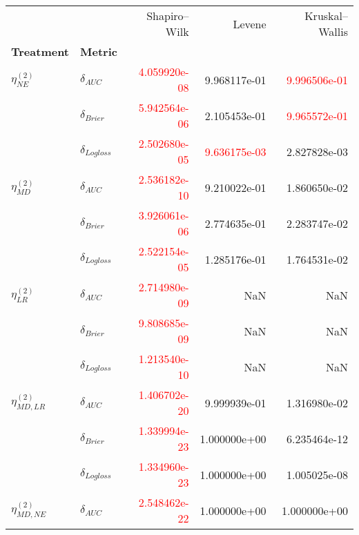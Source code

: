 \begin{table}[!h]
    \centering
    \begin{tabular}{l|lrrr}
        \toprule
                             &         &       Shapiro–Wilk &        Levene &        Kruskal–Wallis \\
        \textbf{Treatment} & \textbf{Metric} &               &               &                \\
        \midrule
        $\eta^{(2)}_{NE}$ & $\delta_{AUC}$ &  \textcolor{red}{4.059920e-08} &  9.968117e-01 &   \textcolor{red}{9.996506e-01} \\
                             & $\delta_{Brier}$ &  \textcolor{red}{5.942564e-06} &  2.105453e-01 &   \textcolor{red}{9.965572e-01} \\
                             & $\delta_{Logloss}$ &  \textcolor{red}{2.502680e-05} &  \textcolor{red}{9.636175e-03} &   2.827828e-03 \\
                             \hline
        $\eta^{(2)}_{MD}$ & $\delta_{AUC}$ &  \textcolor{red}{2.536182e-10} &  9.210022e-01 &   1.860650e-02 \\
                             & $\delta_{Brier}$ &  \textcolor{red}{3.926061e-06} &  2.774635e-01 &   2.283747e-02 \\
                             & $\delta_{Logloss}$ &  \textcolor{red}{2.522154e-05} &  1.285176e-01 &   1.764531e-02 \\
                             \hline
        $\eta^{(2)}_{LR}$ & $\delta_{AUC}$ &  \textcolor{red}{2.714980e-09} &           NaN &            NaN \\
                             & $\delta_{Brier}$ &  \textcolor{red}{9.808685e-09} &           NaN &            NaN \\
                             & $\delta_{Logloss}$ &  \textcolor{red}{1.213540e-10} &           NaN &            NaN \\
                             \hline
        $\eta^{(2)}_{MD, LR}$ & $\delta_{AUC}$ &  \textcolor{red}{1.406702e-20} &  9.999939e-01 &   1.316980e-02 \\
                             & $\delta_{Brier}$ &  \textcolor{red}{1.339994e-23} &  1.000000e+00 &   6.235464e-12 \\
                             & $\delta_{Logloss}$ &  \textcolor{red}{1.334960e-23} &  1.000000e+00 &   1.005025e-08 \\
                             \hline
       $\eta^{(2)}_{MD, NE}$ & $\delta_{AUC}$ &  \textcolor{red}{2.548462e-22} &  1.000000e+00 &   1.000000e+00 \\

\end{tabular}
\end{table}
